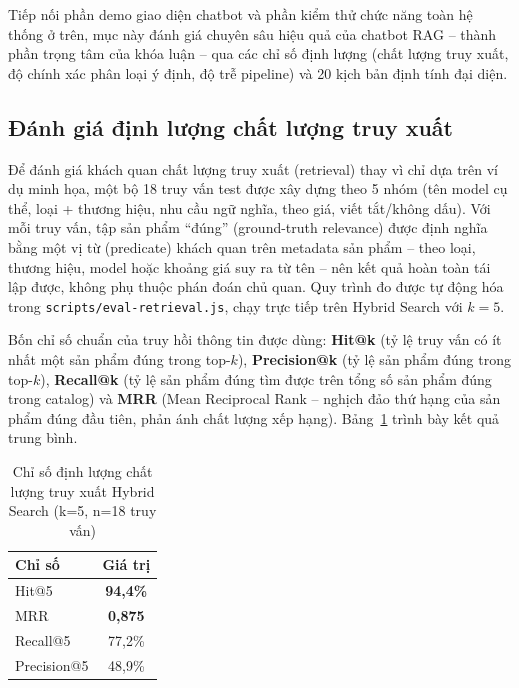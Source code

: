 Tiếp nối phần demo giao diện chatbot và phần kiểm thử chức năng toàn hệ thống ở trên, mục này đánh giá chuyên sâu hiệu quả của chatbot RAG -- thành phần trọng tâm của khóa luận -- qua các chỉ số định lượng (chất lượng truy xuất, độ chính xác phân loại ý định, độ trễ pipeline) và 20 kịch bản định tính đại diện.

\subsection{Đánh giá định lượng chất lượng truy xuất}
\label{sec:c4_rag_quantitative}

Để đánh giá khách quan chất lượng truy xuất (retrieval) thay vì chỉ dựa trên ví dụ minh họa, một bộ 18 truy vấn test được xây dựng theo 5 nhóm (tên model cụ thể, loại + thương hiệu, nhu cầu ngữ nghĩa, theo giá, viết tắt\slash không dấu). Với mỗi truy vấn, tập sản phẩm ``đúng'' (ground-truth relevance) được định nghĩa bằng một vị từ (predicate) khách quan trên metadata sản phẩm -- theo loại, thương hiệu, model hoặc khoảng giá suy ra từ tên -- nên kết quả hoàn toàn tái lập được, không phụ thuộc phán đoán chủ quan. Quy trình đo được tự động hóa trong \texttt{scripts/eval-retrieval.js}, chạy trực tiếp trên Hybrid Search với $k=5$.

Bốn chỉ số chuẩn của truy hồi thông tin được dùng: \textbf{Hit@k} (tỷ lệ truy vấn có ít nhất một sản phẩm đúng trong top-$k$), \textbf{Precision@k} (tỷ lệ sản phẩm đúng trong top-$k$), \textbf{Recall@k} (tỷ lệ sản phẩm đúng tìm được trên tổng số sản phẩm đúng trong catalog) và \textbf{MRR} (Mean Reciprocal Rank -- nghịch đảo thứ hạng của sản phẩm đúng đầu tiên, phản ánh chất lượng xếp hạng). Bảng~\ref{tab:retrieval_metrics} trình bày kết quả trung bình.

\begin{table}[H]
  \centering
  \caption{Chỉ số định lượng chất lượng truy xuất Hybrid Search (k=5, n=18 truy vấn)}
  \label{tab:retrieval_metrics}
  \begin{tabular}{|l|c|}
    \hline
    \textbf{Chỉ số} & \textbf{Giá trị} \\
    \hline
    Hit@5 & \textbf{94,4\%} \\
    \hline
    MRR & \textbf{0,875} \\
    \hline
    Recall@5 & 77,2\% \\
    \hline
    Precision@5 & 48,9\% \\
    \hline
  \end{tabular}
\end{table}

